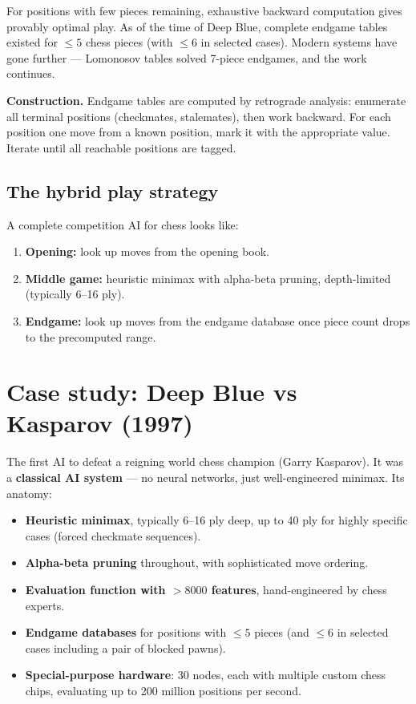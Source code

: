 \documentclass[11pt, a4paper]{article}
\begin{document}
For positions with few pieces remaining, exhaustive backward computation gives provably optimal play. As of the time of Deep Blue, complete endgame tables existed for $\le 5$ chess pieces (with $\le 6$ in selected cases). Modern systems have gone further — Lomonosov tables solved 7-piece endgames, and the work continues.

\textbf{Construction.} Endgame tables are computed by retrograde analysis: enumerate all terminal positions (checkmates, stalemates), then work backward. For each position one move from a known position, mark it with the appropriate value. Iterate until all reachable positions are tagged.

\subsection{The hybrid play strategy}

A complete competition AI for chess looks like:

\begin{enumerate}
  \item \textbf{Opening:} look up moves from the opening book.
  \item \textbf{Middle game:} heuristic minimax with alpha-beta pruning, depth-limited (typically 6--16 ply).
  \item \textbf{Endgame:} look up moves from the endgame database once piece count drops to the precomputed range.
\end{enumerate}

\section{Case study: Deep Blue vs Kasparov (1997)}

The first AI to defeat a reigning world chess champion (Garry Kasparov). It was a \textbf{classical AI system} — no neural networks, just well-engineered minimax. Its anatomy:

\begin{itemize}
  \item \textbf{Heuristic minimax}, typically 6--16 ply deep, up to 40 ply for highly specific cases (forced checkmate sequences).
  \item \textbf{Alpha-beta pruning} throughout, with sophisticated move ordering.
  \item \textbf{Evaluation function with $> 8000$ features}, hand-engineered by chess experts.
  \item \textbf{Endgame databases} for positions with $\le 5$ pieces (and $\le 6$ in selected cases including a pair of blocked pawns).
  \item \textbf{Special-purpose hardware}: 30 nodes, each with multiple custom chess chips, evaluating up to 200 million positions per second.
\end{itemize}
\end{document}
